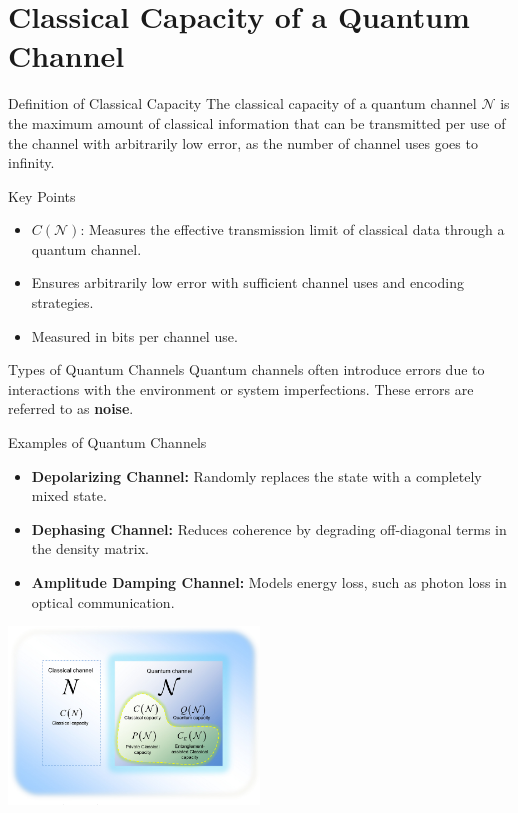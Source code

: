 \section{Classical Capacity of a Quantum Channel}

\begin{frame}{Definition of Classical Capacity}
    The classical capacity of a quantum channel \( \mathcal{N} \) is the maximum amount of classical information that can be transmitted per use of the channel with arbitrarily low error, as the number of channel uses goes to infinity.

    \begin{block}{Key Points}
        \begin{itemize}
            \item \( C(\mathcal{N}) \): Measures the effective transmission limit of classical data through a quantum channel.
            \item Ensures arbitrarily low error with sufficient channel uses and encoding strategies.
            \item Measured in bits per channel use.
        \end{itemize}
    \end{block}
\end{frame}


\begin{frame}{Types of Quantum Channels}
    Quantum channels often introduce errors due to interactions with the environment or system imperfections. These errors are referred to as \textbf{noise}.

    \begin{block}{Examples of Quantum Channels}
        \begin{itemize}
            \item \textbf{Depolarizing Channel:} Randomly replaces the state with a completely mixed state.
            \item \textbf{Dephasing Channel:} Reduces coherence by degrading off-diagonal terms in the density matrix.
            \item \textbf{Amplitude Damping Channel:} Models energy loss, such as photon loss in optical communication.
        \end{itemize}
    \end{block}

    \begin{center}
        \includegraphics[width=0.5\textwidth]{figures/properties_channels.png}
    \end{center}
\end{frame}


